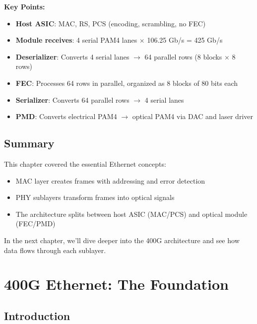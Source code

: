 \documentclass[openany]{tufte-book}
\begin{document}

\textbf{Key Points:}
\begin{itemize}
\item \textbf{Host ASIC}: MAC, RS, PCS (encoding, scrambling, no FEC)
\item \textbf{Module receives}: 4 serial PAM4 lanes $\times$ 106.25 Gb/s = 425 Gb/s
\item \textbf{Deserializer}: Converts 4 serial lanes $\rightarrow$ 64 parallel rows (8 blocks $\times$ 8 rows)
\item \textbf{FEC}: Processes 64 rows in parallel, organized as 8 blocks of 80 bits each
\item \textbf{Serializer}: Converts 64 parallel rows $\rightarrow$ 4 serial lanes
\item \textbf{PMD}: Converts electrical PAM4 $\rightarrow$ optical PAM4 via DAC and laser driver
\end{itemize}

\section{Summary}

This chapter covered the essential Ethernet concepts:
\begin{itemize}
\item MAC layer creates frames with addressing and error detection
\item PHY sublayers transform frames into optical signals
\item The architecture splits between host ASIC (MAC/PCS) and optical module (FEC/PMD)
\end{itemize}

In the next chapter, we'll dive deeper into the 400G architecture and see how data flows through each sublayer.


\chapter{400G Ethernet: The Foundation}

\section{Introduction}
\end{document}
